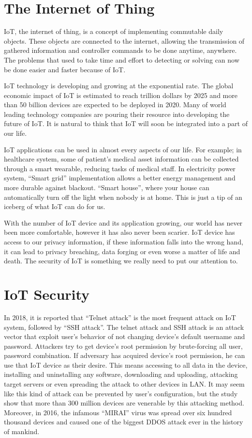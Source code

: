 \section{The Internet of Thing}

IoT, the internet of thing, is a concept of implementing commutable daily objects. These objects are connected to the internet, allowing the transmission of gathered information and controller commands to be done anytime, anywhere. The problems that used to take time and effort to detecting or solving can now be done easier and faster because of IoT.  

IoT technology is developing and growing at the exponential rate. The global economic impact of IoT is estimated to reach trillion dollars by 2025 and more than 50 billion devices are expected to be deployed in 2020. \parencite{INTRO:1} Many of world leading technology companies are pouring their resource into developing the future of IoT.\parencite{INTRO:7123563} It is natural to think that IoT will soon be integrated into a part of our life.  
  
IoT applications can be used in almost every aspects of our life. For example; in healthcare system, some of patient’s medical asset information can be collected through a smart wearable, reducing tasks of medical staff. In electricity power system, “Smart grid” implementation allows a better energy management and more durable against blackout. “Smart house”, where your house can automatically turn off the light when nobody is at home. This is just a tip of an iceberg of what IoT can do for us. 
 
With the number of IoT device and its application growing, our world has never been more comfortable, however it has also never been scarier. IoT device has access to our privacy information, if these information falls into the wrong hand, it can lead to privacy breaching, data forging or even worse a matter of life and death. The security of IoT is something we really need to put our attention to. 
 
\section{IoT Security}
  
In 2018, it is reported that “Telnet attack” is the most frequent attack on IoT system, followed by “SSH attack”. \cite{ATTACK:1} The telnet attack and SSH attack is an attack vector that exploit user’s behavior of not changing device’s default username and password. Attackers try to get device’s root permission by brute-forcing all user, password combination. If adversary has acquired device’s root permission, he can use that IoT device as their desire. This means accessing to all data in the device, installing and uninstalling any software, downloading and uploading, attacking target servers or even spreading the attack to other devices in LAN. It may seem like this kind of attack can be prevented by user’s configuration, but the study show that more than 300 million devices are venerable by this attacking method. Moreover, in 2016, the infamous “MIRAI” virus was spread over six hundred thousand devices and caused one of the biggest DDOS attack ever in the history of mankind.\parencite{ATTACK:7971869}  

